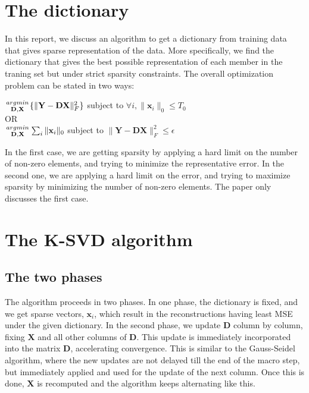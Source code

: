 \documentclass[10pt,a4paper,final]{article}
\begin{document}
\section{The dictionary}
In this report, we discuss an algorithm to get a dictionary from training data that gives sparse representation of the data. More specifically, we find the dictionary that gives the best possible representation of each member in the traning set but under strict sparsity constraints. The overall optimization problem can be stated in two ways: \\
\begin{center}
$\genfrac{}{}{0pt}{}{argmin}{\mathbf{D},\mathbf{X}}\{\|\mathbf{Y}-\mathbf{DX}\|_F^2\}$ subject to $\forall i, \|\mathbf{x}_i\|_0 \leq T_0$\\
OR\\
$\genfrac{}{}{0pt}{}{argmin}{\mathbf{D}, \mathbf{X}}\sum_i\|\mathbf{x}_i\|_0$ subject to $\|\mathbf{Y}-\mathbf{DX}\|_F^2 \leq \epsilon$\\
\end{center}
In the first case, we are getting sparsity by applying a hard limit on the number of non-zero elements, and trying to minimize the representative error. In the second one, we are applying a hard limit on the error, and trying to maximize sparsity by minimizing the number of non-zero elements. The paper only discusses the first case. \pagebreak
\section{The K-SVD algorithm}
\subsection{The two phases}
The algorithm proceeds in two phases. In one phase, the dictionary is fixed, and we get sparse vectors, $\mathbf{x}_i$, which result in the reconstructions having least MSE under the given dictionary. 
In the second phase, we update $\mathbf{D}$ column by column, fixing $\mathbf{X}$ and all other columns of $\mathbf{D}$. This update is immediately incorporated into the matrix $\mathbf{D}$, accelerating convergence. This is similar to the Gauss-Seidel algorithm, where the new updates are not delayed till the end of the macro step, but immediately applied and used for the update of the next column. Once this is done, $\mathbf{X}$ is recomputed and the algorithm keeps alternating like this.
\end{document}
